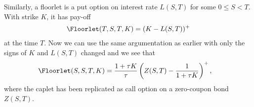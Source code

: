Similarly, a floorlet is a put option on interest rate $L(S,T)$ for some $0 \leq S < T$. With strike $K$, it has pay-off 
  \begin{align}
     \Floorlet (T,S,T,K) = (K - L(S,T))^+
  \end{align}
at the time $T$. Now we can use the same argumentation as earlier with only the signs of $K$ and $L(S,T)$ changed and we see that
  \begin{align}
     \Floorlet (S,S,T,K) &= \frac{ 1 + \tau K }{\tau} \left( Z(S,T) - \frac{1}{1 + \tau K}  \right)^+,
  \end{align}
where the caplet has been replicated as call option on a zero-coupon bond $Z(S,T)$.
